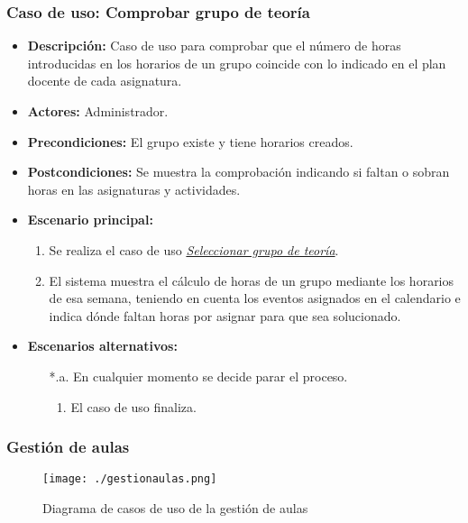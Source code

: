 \subsubsection*{Caso de uso: Comprobar grupo de teoría}
\begin{itemize}
\item{\bf Descripción:} Caso de uso para comprobar que el número de horas introducidas en los horarios de un grupo coincide con lo indicado en el plan docente de cada asignatura.
\item{\bf Actores:} Administrador.
\item{\bf Precondiciones:} El grupo existe y tiene horarios creados.
\item{\bf Postcondiciones:} Se muestra la comprobación indicando si faltan o sobran horas en las asignaturas y actividades.
\item{\bf Escenario principal:}
	\begin{enumerate}
	\item Se realiza el caso de uso {\em \hyperref[select_grupo]{Seleccionar grupo de teoría}}.
	\item El sistema muestra el cálculo de horas de un grupo mediante los horarios de esa semana, teniendo en cuenta los eventos asignados en el calendario e indica dónde faltan horas por asignar para que sea solucionado.
	\end{enumerate}
\item{\bf Escenarios alternativos:}
	\begin{itemize}
		\item[*.a.] En cualquier momento se decide parar el proceso.
		\begin{enumerate}
			\item El caso de uso finaliza.
		\end{enumerate}
	\end{itemize}
\end{itemize}



\subsubsection{Gestión de aulas}
\begin{figure}[H] 
  \label{gestion-aulas} 
	\begin{center}
    \texttt{[image: ./gestionaulas.png]}
  \end{center}
\caption{Diagrama de casos de uso de la gestión de aulas}
\end{figure}
